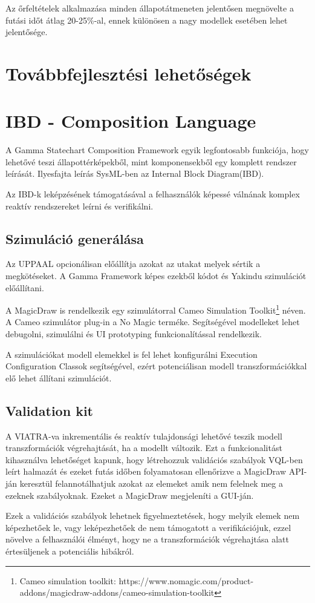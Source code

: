Az őrfeltételek alkalmazása minden állapotátmeneten jelentősen megnövelte a futási időt átlag 20-25\%-al, ennek különösen a nagy modellek esetében lehet jelentősége.

\section{Továbbfejlesztési lehetőségek}
\label{sec:jovoben}
\section{IBD - Composition Language}
A Gamma Statechart Composition Framework egyik legfontosabb funkciója, hogy lehetővé teszi állapottérképekből, mint komponensekből egy komplett rendszer leírását. Ilyesfajta leírás SysML-ben az Internal Block Diagram(IBD).

Az IBD-k leképzésének támogatásával a felhasználók képessé válnának komplex reaktív rendszereket leírni és verifikálni.

\subsection{Szimuláció generálása}

Az UPPAAL opcionálisan előállítja azokat az utakat melyek sértik a megkötéseket. A Gamma Framework képes ezekből kódot és Yakindu szimulációt előállítani.

A MagicDraw is rendelkezik egy szimulátorral Cameo Simulation Toolkit\footnote{Cameo simulation toolkit: https://www.nomagic.com/product-addons/magicdraw-addons/cameo-simulation-toolkit} néven. A Cameo szimulátor plug-in a No Magic terméke. Segítségével modelleket lehet debugolni, szimulálni és UI prototyping funkcionalítással rendelkezik.

A szimulációkat modell elemekkel is fel lehet konfigurálni Execution Configuration Classok segítségével, ezért potenciálisan modell transzformációkkal elő lehet állítani szimulációt.

\subsection{Validation kit}

A VIATRA-va inkrementális és reaktív tulajdonsági lehetővé teszik modell transzformációk végrehajtását, ha a modellt változik. Ezt a funkcionalitást kihasználva lehetőséget kapunk, hogy létrehozzuk validációs szabályok VQL-ben leírt halmazát és ezeket futás időben folyamatosan ellenőrizve a MagicDraw API-ján keresztül felannotálhatjuk azokat az elemeket amik nem felelnek meg a ezeknek szabályoknak. Ezeket a MagicDraw megjeleníti a GUI-ján.

Ezek a validációs szabályok lehetnek figyelmeztetések, hogy melyik elemek nem képezhetőek le, vagy leképezhetőek de nem támogatott a verifikációjuk, ezzel növelve a felhasználói élményt, hogy ne a transzformációk végrehajtása alatt értesüljenek a potenciális hibákról.




